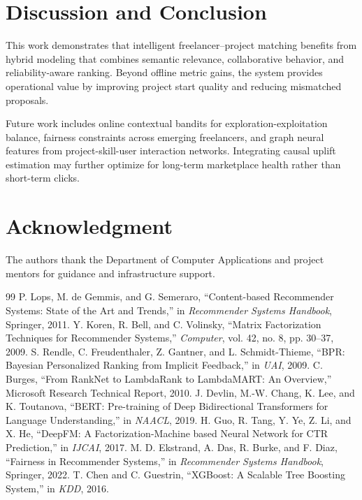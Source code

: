 \documentclass[conference]{IEEEtran}
\begin{document}
\section{Discussion and Conclusion}
This work demonstrates that intelligent freelancer--project matching benefits from hybrid modeling that combines semantic relevance, collaborative behavior, and reliability-aware ranking. Beyond offline metric gains, the system provides operational value by improving project start quality and reducing mismatched proposals.

Future work includes online contextual bandits for exploration-exploitation balance, fairness constraints across emerging freelancers, and graph neural features from project-skill-user interaction networks. Integrating causal uplift estimation may further optimize for long-term marketplace health rather than short-term clicks.

\section*{Acknowledgment}
The authors thank the Department of Computer Applications and project mentors for guidance and infrastructure support.

\begin{thebibliography}{99}
 P. Lops, M. de Gemmis, and G. Semeraro, ``Content-based Recommender Systems: State of the Art and Trends,'' in \textit{Recommender Systems Handbook}, Springer, 2011.
 Y. Koren, R. Bell, and C. Volinsky, ``Matrix Factorization Techniques for Recommender Systems,'' \textit{Computer}, vol. 42, no. 8, pp. 30--37, 2009.
 S. Rendle, C. Freudenthaler, Z. Gantner, and L. Schmidt-Thieme, ``BPR: Bayesian Personalized Ranking from Implicit Feedback,'' in \textit{UAI}, 2009.
 C. Burges, ``From RankNet to LambdaRank to LambdaMART: An Overview,'' Microsoft Research Technical Report, 2010.
 J. Devlin, M.-W. Chang, K. Lee, and K. Toutanova, ``BERT: Pre-training of Deep Bidirectional Transformers for Language Understanding,'' in \textit{NAACL}, 2019.
 H. Guo, R. Tang, Y. Ye, Z. Li, and X. He, ``DeepFM: A Factorization-Machine based Neural Network for CTR Prediction,'' in \textit{IJCAI}, 2017.
 M. D. Ekstrand, A. Das, R. Burke, and F. Diaz, ``Fairness in Recommender Systems,'' in \textit{Recommender Systems Handbook}, Springer, 2022.
 T. Chen and C. Guestrin, ``XGBoost: A Scalable Tree Boosting System,'' in \textit{KDD}, 2016.
\end{thebibliography}
\end{document}
